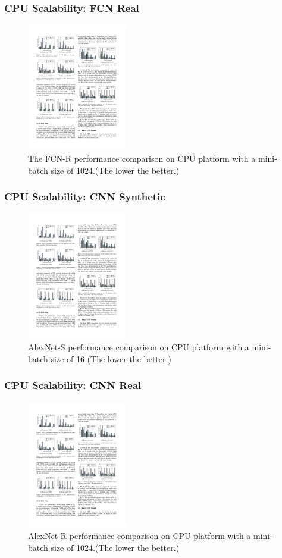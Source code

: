 
\begin{frame}
	\MyLogo
	\frametitle{CPU Scalability: FCN Real}  
	\begin{figure}[htbp] 
		\includegraphics[height=2.2in]{figures/FCN-R1.pdf} 
		\caption{The FCN-R performance comparison on CPU platform with a mini-batch size of 1024.(The lower the better.)}
	\end{figure}
\end{frame}


\begin{frame}
	\MyLogo
	\frametitle{CPU Scalability: CNN Synthetic}  

	\begin{figure}[htbp] 
		\includegraphics[height=2.2in]{figures/AlexNet-S1.pdf} 
		\caption{AlexNet-S performance comparison on CPU platform with a mini-batch size of 16 (The lower the better.)}
	\end{figure}	
\end{frame}


\begin{frame}
	\MyLogo
	\frametitle{CPU Scalability: CNN Real}  
	\begin{figure}[htbp] 
		\includegraphics[height=2.2in]{figures/AlexNet-R1.pdf} 
		\caption{AlexNet-R performance comparison on CPU platform with a mini-batch size of 1024.(The lower the better.)}
	\end{figure}
\end{frame}

